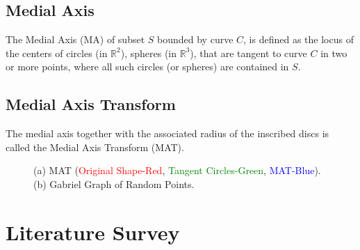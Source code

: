 \documentclass[preprint,5p,times,twocolumn]{elsarticle}
\begin{document}
\subsection{Medial Axis}
The Medial Axis (MA) of subset $S$ bounded by curve $C$, is defined as the locus of the centers of circles (in $\mathbb{R}^2$), spheres (in $\mathbb{R}^3$), that are tangent to curve $C$ in two or more points, where all such circles (or spheres) are contained in $S$.

\subsection{Medial Axis Transform}
The medial axis together with the associated radius of the inscribed discs is called the Medial Axis Transform (MAT).


\begin{figure}[!h]
	\centering
	\caption{
		\label{teaser_fig}(a) MAT (\textcolor{red}{Original Shape-Red}, \textcolor{green}{Tangent Circles-Green}, \textcolor{blue}{MAT-Blue}). (b) Gabriel Graph of Random Points.
	}
\end{figure}


\section{Literature Survey}
\end{document}
